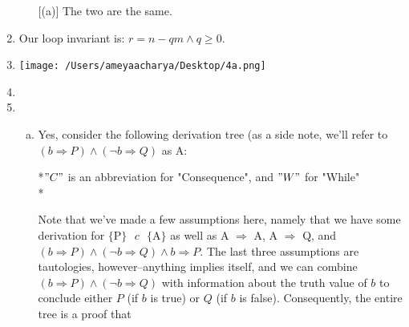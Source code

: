 \documentclass[10pt, oneside]{article}
\begin{document}
\begin{enumerate}[1.]
\begin{enumerate} [(a)]
   The two are the same.

  \end{enumerate}

  \item Our loop invariant is: $r = n - qm \wedge q \geq 0.$

\pagebreak

    \item     \hspace{4mm}
    
    \texttt{[image: /Users/ameyaacharya/Desktop/4a.png]}
    \item


  \item
  \begin{enumerate} [(a)]
    \item
      Yes, consider the following derivation tree (as a side note, we'll refer to 
  		$(b \Rightarrow P) \wedge (\neg b \Rightarrow Q)$ as A:
      
      \begin{prooftree}
        
        
      \end{prooftree}
      
      *$"C"$ is an abbreviation for "Consequence", and $"W"$ for "While" \\*
      
      Note that we've made a few assumptions here, namely that we have some 
      derivation for $\{\text{P}\} \text{ } c \text{ } \{\text{A}\}$ as well as 
      A $\Rightarrow$ A, A $\Rightarrow$ Q, and $(b \Rightarrow P) \wedge (\neg b 
      \Rightarrow Q) \wedge b \Rightarrow P$. The last three assumptions are 
      tautologies, however--anything implies itself, and we can combine $(b 
      \Rightarrow P) \wedge (\neg b \Rightarrow Q)$ with information about the
      truth value of $b$ to conclude either $P$ (if $b$ is true) or $Q$ (if $b$ 
      is false). Consequently, the entire tree is a proof that 
      

\end{enumerate}
\end{enumerate}
\end{document}
